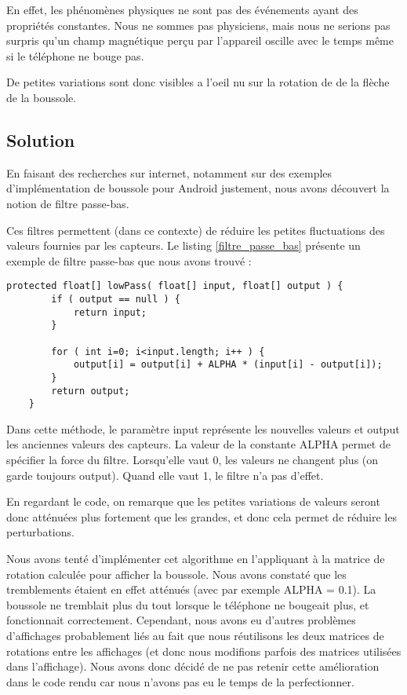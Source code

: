 \documentclass[francais,12pt]{article}
\begin{document}
	En effet, les phénomènes physiques ne sont pas des événements ayant des propriétés constantes. Nous ne sommes pas physiciens, mais nous ne serions pas surpris qu'un champ magnétique perçu par l'appareil oscille avec le temps même si le téléphone ne bouge pas. 
	
	De petites variations sont donc visibles a l'oeil nu sur la rotation de de la flèche de la boussole.
	
	\subsection*{Solution}
	En faisant des recherches sur internet, notamment sur des exemples d'implémentation de boussole pour Android justement, nous avons découvert la notion de filtre passe-bas. 
	
	Ces filtres permettent (dans ce contexte) de réduire les petites fluctuations des valeurs fournies par les capteurs. Le listing \ref{filtre_passe_bas} présente un exemple de filtre passe-bas que nous avons trouvé : 
	
	\lstset{escapechar=@,style=JavaCode}
	\begin{lstlisting}[caption={Exemple de filtre passe-bas},label={filtre_passe_bas}]
	protected float[] lowPass( float[] input, float[] output ) {
		if ( output == null ) {
			return input;  
		}
		   
		for ( int i=0; i<input.length; i++ ) {
			output[i] = output[i] + ALPHA * (input[i] - output[i]);
		}
		return output;
	}
	\end{lstlisting}
	
	Dans cette méthode, le paramètre input représente les nouvelles valeurs et output les anciennes valeurs des capteurs. La valeur de la constante ALPHA permet de spécifier la force du filtre. Lorsqu'elle vaut 0, les valeurs ne changent plus (on garde toujours output). Quand elle vaut 1, le filtre n'a pas d'effet.
	
	En regardant le code, on remarque que les petites variations de valeurs seront donc atténuées plus fortement que les grandes, et donc cela permet de réduire les perturbations.
	
	Nous avons tenté d'implémenter cet algorithme en l'appliquant à la matrice de rotation calculée pour afficher la boussole. Nous avons constaté que les tremblements étaient en effet atténués (avec par exemple ALPHA = 0.1). La boussole ne tremblait plus du tout lorsque le téléphone ne bougeait plus, et fonctionnait correctement. Cependant, nous avons eu d'autres problèmes d'affichages probablement liés au fait que nous réutilisons les deux matrices de rotations entre les affichages (et donc nous modifions parfois des matrices utilisées dans l'affichage). Nous avons donc décidé de ne pas retenir cette amélioration dans le code rendu car nous n'avons pas eu le temps de la perfectionner.
	
\end{document}

